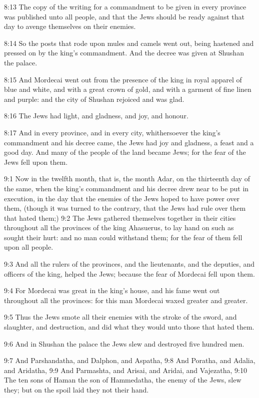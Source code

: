 8:13 The copy of the writing for a commandment to be given in every
province was published unto all people, and that the Jews should be
ready against that day to avenge themselves on their enemies.

8:14 So the posts that rode upon mules and camels went out, being
hastened and pressed on by the king's commandment. And the decree was
given at Shushan the palace.

8:15 And Mordecai went out from the presence of the king in royal
apparel of blue and white, and with a great crown of gold, and with a
garment of fine linen and purple: and the city of Shushan rejoiced and
was glad.

8:16 The Jews had light, and gladness, and joy, and honour.

8:17 And in every province, and in every city, whithersoever the
king's commandment and his decree came, the Jews had joy and gladness,
a feast and a good day. And many of the people of the land became
Jews; for the fear of the Jews fell upon them.

9:1 Now in the twelfth month, that is, the month Adar, on the
thirteenth day of the same, when the king's commandment and his decree
drew near to be put in execution, in the day that the enemies of the
Jews hoped to have power over them, (though it was turned to the
contrary, that the Jews had rule over them that hated them;) 9:2 The
Jews gathered themselves together in their cities throughout all the
provinces of the king Ahasuerus, to lay hand on such as sought their
hurt: and no man could withstand them; for the fear of them fell upon
all people.

9:3 And all the rulers of the provinces, and the lieutenants, and the
deputies, and officers of the king, helped the Jews; because the fear
of Mordecai fell upon them.

9:4 For Mordecai was great in the king's house, and his fame went out
throughout all the provinces: for this man Mordecai waxed greater and
greater.

9:5 Thus the Jews smote all their enemies with the stroke of the
sword, and slaughter, and destruction, and did what they would unto
those that hated them.

9:6 And in Shushan the palace the Jews slew and destroyed five hundred
men.

9:7 And Parshandatha, and Dalphon, and Aspatha, 9:8 And Poratha, and
Adalia, and Aridatha, 9:9 And Parmashta, and Arisai, and Aridai, and
Vajezatha, 9:10 The ten sons of Haman the son of Hammedatha, the enemy
of the Jews, slew they; but on the spoil laid they not their hand.

